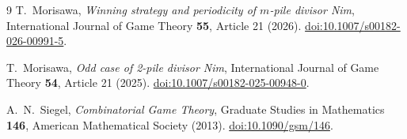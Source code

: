 \documentclass[11pt]{article}
\begin{document}
\begin{thebibliography}{9}
\setlength{\itemsep}{2pt}
T.~Morisawa,
\emph{Winning strategy and periodicity of $m$-pile divisor Nim},
International Journal of Game Theory \textbf{55}, Article 21 (2026).
\href{https://doi.org/10.1007/s00182-026-00991-5}
{doi:10.1007/s00182-026-00991-5}.

T.~Morisawa,
\emph{Odd case of 2-pile divisor Nim},
International Journal of Game Theory \textbf{54}, Article 21 (2025).
\href{https://doi.org/10.1007/s00182-025-00948-0}
{doi:10.1007/s00182-025-00948-0}.

A.~N.~Siegel,
\emph{Combinatorial Game Theory},
Graduate Studies in Mathematics \textbf{146},
American Mathematical Society (2013).
\href{https://doi.org/10.1090/gsm/146}{doi:10.1090/gsm/146}.
\end{thebibliography}
\end{document}
